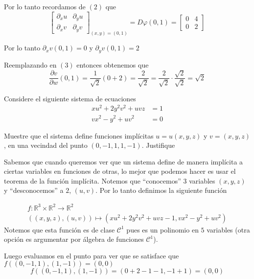 \documentclass[a4paper,oneside,10.5pt]{article}
\newcommand\RR{\mathbb{R}}
\theoremstyle{definition}
\theoremstyle{plain}
\theoremstyle{remark}
\theoremstyle{theorem}
\begin{document}
Por lo tanto recordamos de $(2)$ que
\begin{equation*}
    \begin{bmatrix}
    \partial_x u & \partial_y u\\
    \partial_x v & \partial_y v
\end{bmatrix}_{(x, y) = (0, 1)}= D\varphi(0, 1) =\begin{bmatrix}
        0 & 4\\ 0 & 2
    \end{bmatrix}
\end{equation*}

Por lo tanto $\partial_x v(0, 1) = 0$ y $\partial_y v(0,1) = 2$

Reemplazando en $(3)$ entonces obtenemos que
\begin{equation*}
    \frac{\partial v}{\partial w}(0, 1) = \frac{1}{\sqrt2}(0 + 2) = \frac{2}{\sqrt{2}} = \frac{2}{\sqrt2} \cdot \frac{\sqrt2}{\sqrt2} = \sqrt{2}
\end{equation*}

\prob Considere el siguiente sistema de ecuaciones
\begin{align*}
    xu^2 + 2y^2v^2 + uvz &= 1\\
    vx^2 - y^2 + uv^2 &= 0
\end{align*}

Muestre que el sistema define funciones implícitas $u = u(x, y, z)$ y $v = (x,y,z)$, en una vecindad del punto $(0, -1, 1, 1, -1)$. Justifique

\sol Sabemos que cuando queremos ver que un sistema define de manera implícita a ciertas variables en funciones de otras, lo mejor que podemos hacer es usar el teorema de la función implícita. Notemos que ``conocemos'' $3$ variables $(x, y, z)$ y ``desconocemos'' a $2$, $(u, v)$. Por lo tanto definimos la siguiente función

\begin{gather*}
    f: \RR^3 \times \RR^2 \to \RR^2\\
    ((x, y, z), (u, v)) \mapsto (xu^2 + 2y^2v^2 + uvz - 1, vx^2 - y^2 + uv^2)
\end{gather*}
Notemos que esta función es de clase $\mathcal{C}^1$ pues es un polinomio en $5$ variables (otra opción es argumentar por álgebra de funciones $\mathcal{C}^1$).

Luego evaluamos en el punto para ver que se satisface que $f((0, -1, 1), (1, -1)) = (0, 0)$
\begin{equation*}
    f((0, -1, 1), (1, -1)) = (0 + 2 - 1 - 1, -1 + 1) = (0, 0)
\end{equation*}
\end{document}
